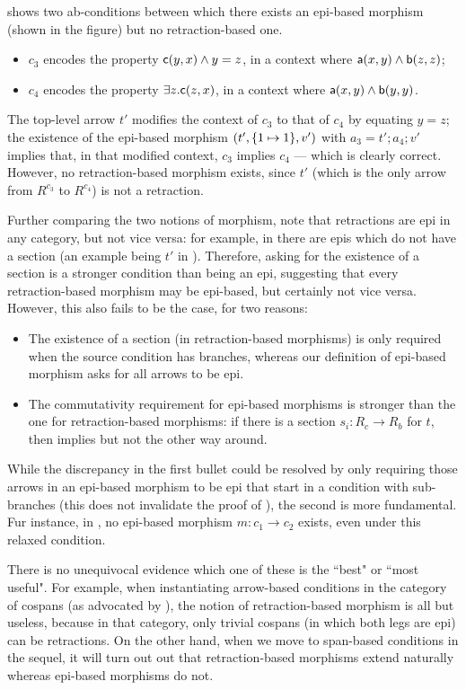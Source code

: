 \begin{example}
 shows two ab-conditions between which there exists an epi-based morphism (shown in the figure) but no retraction-based one.
\begin{itemize}
\item $c_3$ encodes the property $\mathsf{c}(y,x)\wedge y=z$, in a context where $\mathsf{a}(x,y)\wedge \mathsf{b}(z,z)$;
\item $c_4$ encodes the property $\exists z.\mathsf{c}(z,x)$, in a context where $\mathsf{a}(x,y)\wedge \mathsf{b}(y,y)$.
\end{itemize}
The top-level arrow $t'$ modifies the context of $c_3$ to that of $c_4$ by equating $y=z$; the existence of the epi-based morphism $(t',\{{1\mapsto 1}\},v')$ with $a_3=t';a_4;v'$ implies that, in that modified context, $c_3$ implies $c_4$ --- which is clearly correct. However, no retraction-based morphism exists, since $t'$ (which is the only arrow from $R^{c_3}$ to $R^{c_4}$) is not a retraction.
\end{example}
%
Further comparing the two notions of morphism, note that retractions are epi in any category, but not vice versa: for example, in  there are epis which do not have a section (an example being $t'$ in ). Therefore, asking for the existence of a section is a stronger condition than being an epi, suggesting that every retraction-based morphism may be epi-based, but certainly not vice versa. However, this also fails to be the case, for two reasons:
%
\begin{itemize}
\item The existence of a section (in retraction-based morphisms) is only required when the source condition has branches, whereas our definition of epi-based morphism asks for all arrows to be epi.
\item The commutativity requirement for epi-based morphisms is stronger than the one for retraction-based morphisms: if there is a section $s_i: R_c \to R_b$ for $t$, then  implies  but not the other way around.
\end{itemize}
%
While the discrepancy in the first bullet could be resolved by only requiring those arrows in an epi-based morphism to be epi that start in a condition with sub-branches (this does not invalidate the proof of ), the second is more fundamental. Fur instance, in , no epi-based morphism $m:c_1\to c_2$ exists, even under this relaxed condition.

There is no unequivocal evidence which one of these is the ``best" or ``most useful". For example, when instantiating arrow-based conditions in the category of cospans (as advocated by \cite{bchk:conditional-reactive-systems}), the notion of retraction-based morphism is all but useless, because in that category, only trivial cospans (in which both legs are epi) can be retractions. On the other hand, when we move to span-based conditions in the sequel, it will turn out out that retraction-based morphisms extend naturally whereas epi-based morphisms do not.